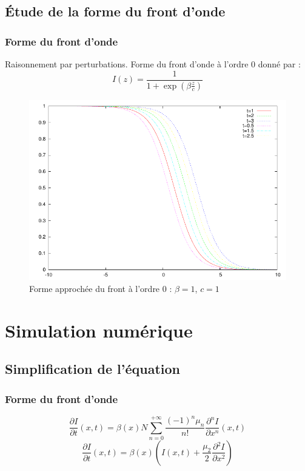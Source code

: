 \documentclass[handout]{beamer}
\newcommand{\derPar}[2]{\frac{\partial #1}{\partial #2}}
\begin{document}
\subsection[Forme]{Étude de la forme du front d'onde}
\begin{frame}
	\frametitle{Forme du front d'onde}
	Raisonnement par perturbations. Forme du front d'onde à l'ordre 0 donné par :
	\[I(z)=\frac{1}{1+\exp\left(\beta\frac{z}{c}\right)}\]
\begin{figure}[!h]
	\centering
	\includegraphics[scale=0.5]{img/plotShape.pdf}
\caption{Forme approchée du front à l'ordre 0 : $\beta=1$, $c=1$}
\label{plotShape}
\end{figure}
\end{frame}


\section[Simulation]{Simulation numérique}
\subsection[Simplification]{Simplification de l'équation}
\begin{frame}
	\frametitle{Forme du front d'onde}
\[\frac{\partial I}{\partial t}(x,t) =\beta(x)N\sum_{n=0}^{+\infty} \frac{(-1)^n\mu_n}{n!} \frac{\partial^n I}{\partial x^n}(x,t)\]
\begin{equation}\label{approx}
	\derPar{I}{t}(x,t)=\beta(x)\left(I(x,t)+\frac{\mu_2}{2}\derPar{{}^2I}{x^2}\right)
\end{equation}

\end{frame}
\end{document}
